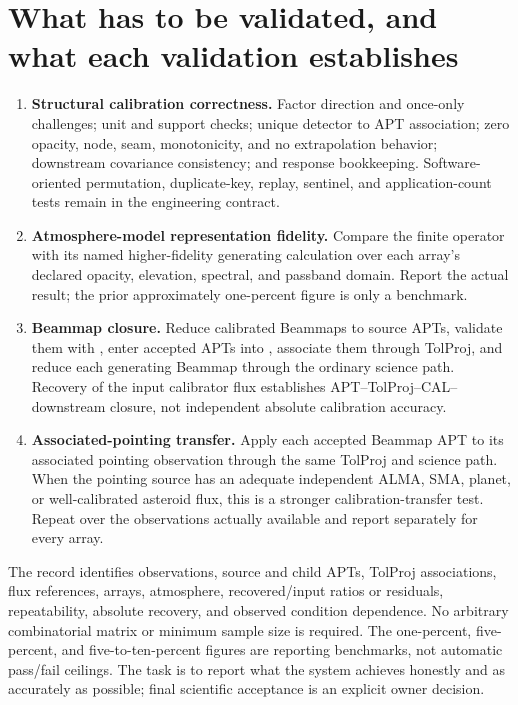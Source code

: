 \documentclass[11pt]{article}
\begin{document}
\section{What has to be validated, and what each validation establishes}\label{sec:validation}
\begin{enumerate}[label=\textbf{\arabic*.},leftmargin=*]
\item \textbf{Structural calibration correctness.} Factor direction and
once-only challenges; unit and support checks; unique detector to APT association;
zero opacity, node, seam, monotonicity, and no extrapolation behavior;
downstream covariance consistency; and response bookkeeping. Software-oriented
permutation, duplicate-key, replay, sentinel, and application-count tests
remain in the engineering contract.
\item \textbf{Atmosphere-model representation fidelity.} Compare the finite
operator with its named higher-fidelity generating calculation over each
array's declared opacity, elevation, spectral, and passband domain. Report the
actual result; the prior approximately one-percent figure is only a benchmark.
\item \textbf{Beammap closure.} Reduce calibrated Beammaps to source APTs,
validate them with , enter accepted APTs into
, associate them through TolProj, and reduce each generating
Beammap through the ordinary science path. Recovery of the input calibrator
flux establishes APT--TolProj--CAL--downstream closure, not independent
absolute calibration accuracy.
\item \textbf{Associated-pointing transfer.} Apply each accepted Beammap APT
to its associated pointing observation through the same TolProj and science
path. When the pointing source has an adequate independent ALMA, SMA, planet,
or well-calibrated asteroid flux, this is a stronger calibration-transfer
test. Repeat over the observations actually available and report separately
for every array.
\end{enumerate}
The record identifies observations, source and child APTs, TolProj
associations, flux references, arrays, atmosphere, recovered/input ratios or
residuals, repeatability, absolute recovery, and observed condition
dependence. No arbitrary combinatorial matrix or minimum sample size is
required. The one-percent, five-percent, and five-to-ten-percent figures are
reporting benchmarks, not automatic pass/fail ceilings. The task is to report
what the system achieves honestly and as accurately as possible; final
scientific acceptance is an explicit owner decision.
\end{document}
